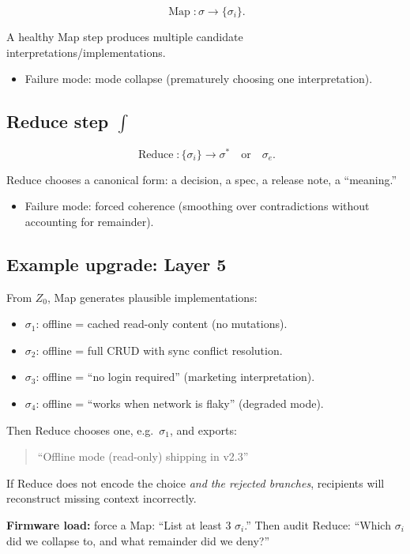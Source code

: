 \documentclass[11pt]{article}
\begin{document}
\[
  \operatorname{Map}:\sigma \rightarrow \{\sigma_i\}.
\]

A healthy Map step produces multiple candidate interpretations/implementations.
\begin{itemize}[leftmargin=2em]
  \item Failure mode: mode collapse (prematurely choosing one interpretation).
\end{itemize}

\subsection{Reduce step $\int$}

\[
  \operatorname{Reduce}:\{\sigma_i\} \rightarrow \sigma^* \quad \text{or} \quad \sigma_e.
\]

Reduce chooses a canonical form: a decision, a spec, a release note, a ``meaning.''
\begin{itemize}[leftmargin=2em]
  \item Failure mode: forced coherence (smoothing over contradictions without accounting for remainder).
\end{itemize}

\subsection{Example upgrade: Layer 5}

From $Z_0$, Map generates plausible implementations:
\begin{itemize}[leftmargin=2em]
  \item $\sigma_1$: offline = cached read-only content (no mutations).
  \item $\sigma_2$: offline = full CRUD with sync conflict resolution.
  \item $\sigma_3$: offline = ``no login required'' (marketing interpretation).
  \item $\sigma_4$: offline = ``works when network is flaky'' (degraded mode).
\end{itemize}

Then Reduce chooses one, e.g.~$\sigma_1$, and exports:
\begin{quote}
  ``Offline mode (read-only) shipping in v2.3''
\end{quote}

If Reduce does not encode the choice \emph{and the rejected branches}, recipients will reconstruct missing context incorrectly.

\textbf{Firmware load:} force a Map: ``List at least 3 $\sigma_i$.'' Then audit Reduce: ``Which $\sigma_i$ did we collapse to, and what remainder did we deny?''
\end{document}

